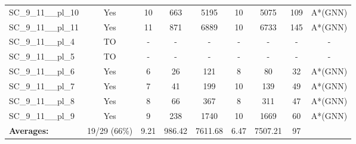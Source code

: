 \documentclass{article}
\begin{document}
\begin{tabular}{lcccccccc}
SC\_9\_11\_\_pl\_10 & Yes & 10 & 663 & 5195 & 10 & 5075 & 109 & A*(GNN) \\
SC\_9\_11\_\_pl\_11 & Yes & 11 & 871 & 6889 & 10 & 6733 & 145 & A*(GNN) \\
SC\_9\_11\_\_pl\_4 & TO & - & - & - & - & - & - & - \\
SC\_9\_11\_\_pl\_5 & TO & - & - & - & - & - & - & - \\
SC\_9\_11\_\_pl\_6 & Yes & 6 & 26 & 121 & 8 & 80 & 32 & A*(GNN) \\
SC\_9\_11\_\_pl\_7 & Yes & 7 & 41 & 199 & 10 & 139 & 49 & A*(GNN) \\
SC\_9\_11\_\_pl\_8 & Yes & 8 & 66 & 367 & 8 & 311 & 47 & A*(GNN) \\
SC\_9\_11\_\_pl\_9 & Yes & 9 & 238 & 1740 & 10 & 1669 & 60 & A*(GNN) \\
\textbf{Averages:} & 19/29 (66\%) & 9.21 & 986.42 & 7611.68 & 6.47 & 7507.21 & 97 & \\
\bottomrule
\end{tabular}
\\[0.7cm]
\end{document}

